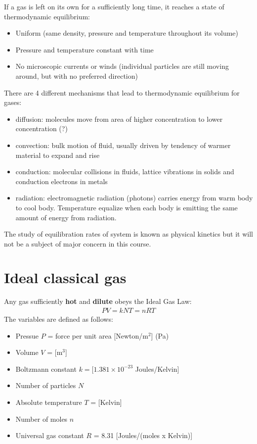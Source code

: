\documentclass[11pt]{article}
\begin{document}
If a gas is left on its own for a sufficiently long time, it reaches a state of thermodynamic equilibrium: 
\begin{itemize}
    \item Uniform (same density, pressure and temperature throughout its volume) 
    \item Pressure and temperature constant with time
    \item No microscopic currents or winds (individual particles are still moving around, but with no preferred direction) 
\end{itemize}
There are 4 different mechanisms that lead to thermodynamic equilibrium for gases: 
\begin{itemize}
    \item diffusion: molecules move from area of higher concentration to lower concentration (?)
    \item convection: bulk motion of fluid, usually driven by tendency of warmer material to expand and rise
    \item conduction: molecular collisions in fluids, lattice vibrations in solids and conduction electrons in metals
    \item radiation: electromagnetic radiation (photons) carries energy from warm body to cool body. Temperature equalize when each body is emitting the same amount of energy from radiation. 
\end{itemize}

The study of equilibration rates of system is known as physical kinetics but it will not be a subject of major concern in this course. 

\section{Ideal classical gas}
Any gas sufficiently \textbf{hot} and \textbf{dilute} obeys the Ideal Gas Law:
\begin{align*}
    PV = kNT = nRT
\end{align*}
The variables are defined as follows:
\begin{itemize}
    \item Pressue $P$ = force per unit area [Newton/m$^2$] (Pa)
    \item Volume $V$ = [m$^3$]
    \item Boltzmann constant $k = [1.381 \times 10^{-23}$ Joules/Kelvin]
    \item Number of particles $N$
    \item Absolute temperature $T$ = [Kelvin]
    \item Number of moles $n$ 
    \item Universal gas constant $R$ = 8.31 [Joules/(moles x Kelvin)]
\end{itemize}
\end{document}
